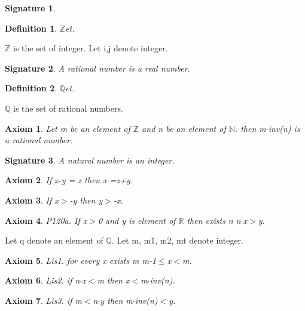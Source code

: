 \documentclass{article}
\newenvironment{forthel}{\begin{leftbar}}{\end{leftbar}}
\newtheorem{axiom}{Axiom}
\newtheorem{definition}{Definition}
\newtheorem{signature}{Signature}
\begin{document}
\begin{forthel}
\begin{signature}
\end{signature}

\begin{definition} $\mathbb{Z}$et.

\end{definition}
$\mathbb{Z}$ is the set of integer.
Let i,j denote integer.


\begin{signature} A rational number is a real number.

\end{signature}

\begin{definition} $\mathbb{Q}$et.

\end{definition}
$\mathbb{Q}$ is the set of rational numbers.

\begin{axiom} Let m be an element of $\mathbb{Z}$ and n be an element of $\mathbb{N}$. then m$\cdot$inv(n) is a rational number.

\end{axiom}

\begin{signature} A natural number is an integer.

\end{signature}


\begin{axiom} If x-y = z then x =z+y. 

\end{axiom}
\begin{axiom} If x$>$-y then y$>$-x. 

\end{axiom}


\begin{axiom} P120a. If x$>$0 and y is element of $\mathbb{R}$ then exists n  n$\cdot$x$>$y.

\end{axiom}


Let q denote an element of $\mathbb{Q}$.
Let m, m1, m2, mt denote integer.


\begin{axiom} Lis1. for every x exists m m-1$\leq$x$<$m.

\end{axiom}
\begin{axiom} Lis2. if n$\cdot$x$<$m then x$<$m$\cdot$inv(n).

\end{axiom}
\begin{axiom} Lis3. if m$<$n$\cdot$y then m$\cdot$inv(n)$<$y.


\end{axiom}
\end{forthel}
\end{document}
